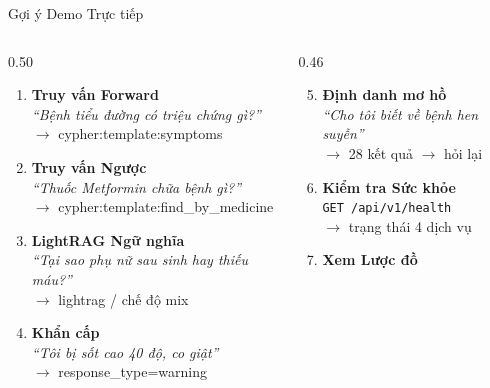 \documentclass[aspectratio=169, 11pt]{beamer}
\begin{document}
\begin{frame}{Gợi ý Demo Trực tiếp}
  \begin{columns}[t]
    \begin{column}{0.50\textwidth}
      \begin{enumerate}
        \small
        \item \textbf{Truy vấn Forward}\\
          \textit{``Bệnh tiểu đường có triệu chứng gì?''}\\
          \textcolor{successGreen}{$\to$ cypher:template:symptoms}
        \vspace{3pt}
        \item \textbf{Truy vấn Ngược}\\
          \textit{``Thuốc Metformin chữa bệnh gì?''}\\
          \textcolor{successGreen}{$\to$ cypher:template:find\_by\_medicine}
        \vspace{3pt}
        \item \textbf{LightRAG Ngữ nghĩa}\\
          \textit{``Tại sao phụ nữ sau sinh hay thiếu máu?''}\\
          \textcolor{tealAccent}{$\to$ lightrag / chế độ mix}
        \vspace{3pt}
        \item \textbf{Khẩn cấp}\\
          \textit{``Tôi bị sốt cao 40 độ, co giật''}\\
          \textcolor{warnOrange}{$\to$ response\_type=warning}
      \end{enumerate}
    \end{column}
    \begin{column}{0.46\textwidth}
      \begin{enumerate}
        \setcounter{enumi}{4}
        \small
        \item \textbf{Định danh mơ hồ}\\
          \textit{``Cho tôi biết về bệnh hen suyễn''}\\
          \textcolor{medBlue}{$\to$ 28 kết quả $\to$ hỏi lại}
        \vspace{3pt}
        \item \textbf{Kiểm tra Sức khỏe}\\
          \texttt{GET /api/v1/health}\\
          \textcolor{successGreen}{$\to$ trạng thái 4 dịch vụ}
        \vspace{3pt}
        \item \textbf{Xem Lược đồ}\\

\end{enumerate}
\end{column}
\end{columns}
\end{frame}
\end{document}
